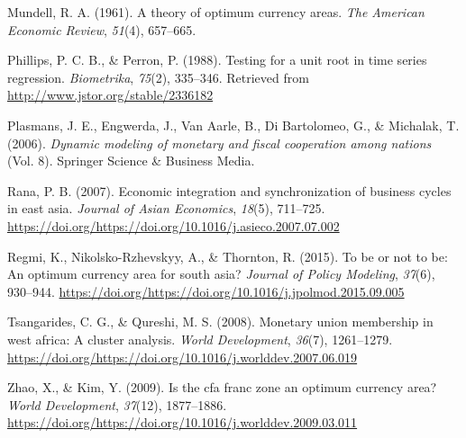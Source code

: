 \documentclass[]{article}
\begin{document}
\leavevmode\hypertarget{ref-mundell1961theory}{}%
Mundell, R. A. (1961). A theory of optimum currency areas. \emph{The American Economic Review}, \emph{51}(4), 657--665.

\leavevmode\hypertarget{ref-10.2307ux2f2336182}{}%
Phillips, P. C. B., \& Perron, P. (1988). Testing for a unit root in time series regression. \emph{Biometrika}, \emph{75}(2), 335--346. Retrieved from \url{http://www.jstor.org/stable/2336182}

\leavevmode\hypertarget{ref-plasmans2006dynamic}{}%
Plasmans, J. E., Engwerda, J., Van Aarle, B., Di Bartolomeo, G., \& Michalak, T. (2006). \emph{Dynamic modeling of monetary and fiscal cooperation among nations} (Vol. 8). Springer Science \& Business Media.

\leavevmode\hypertarget{ref-RANA2007711}{}%
Rana, P. B. (2007). Economic integration and synchronization of business cycles in east asia. \emph{Journal of Asian Economics}, \emph{18}(5), 711--725. \url{https://doi.org/https://doi.org/10.1016/j.asieco.2007.07.002}

\leavevmode\hypertarget{ref-Regmi2015}{}%
Regmi, K., Nikolsko-Rzhevskyy, A., \& Thornton, R. (2015). To be or not to be: An optimum currency area for south asia? \emph{Journal of Policy Modeling}, \emph{37}(6), 930--944. \url{https://doi.org/https://doi.org/10.1016/j.jpolmod.2015.09.005}

\leavevmode\hypertarget{ref-TSANGARIDES20081261}{}%
Tsangarides, C. G., \& Qureshi, M. S. (2008). Monetary union membership in west africa: A cluster analysis. \emph{World Development}, \emph{36}(7), 1261--1279. \url{https://doi.org/https://doi.org/10.1016/j.worlddev.2007.06.019}

\leavevmode\hypertarget{ref-Zhao2009}{}%
Zhao, X., \& Kim, Y. (2009). Is the cfa franc zone an optimum currency area? \emph{World Development}, \emph{37}(12), 1877--1886. \url{https://doi.org/https://doi.org/10.1016/j.worlddev.2009.03.011}
\end{document}
